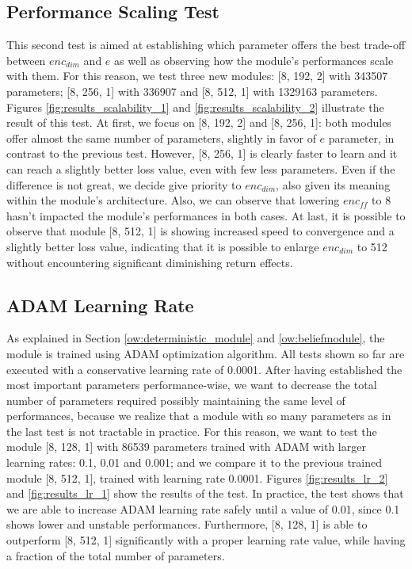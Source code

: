         \subsection{Performance Scaling Test}
            This second test is aimed at establishing which parameter offers the best trade-off between $enc_{dim}$ and $e$ as well as observing how the module's performances scale with them. For this reason, we test three new modules: [8, 192, 2] with 343507 parameters; [8, 256, 1] with 336907 and [8, 512, 1] with 1329163 parameters. Figures \ref{fig:results_scalability_1} and \ref{fig:results_scalability_2} illustrate the result of this test. \newline
            At first, we focus on [8, 192, 2] and [8, 256, 1]: both modules offer almost the same number of parameters, slightly in favor of $e$ parameter, in contrast to the previous test. However, [8, 256, 1] is clearly faster to learn and it can reach a slightly better loss value, even with few less parameters. Even if the difference is not great, we decide give priority to $enc_{dim}$, also given its meaning within the module's architecture. Also, we can observe that lowering $enc_{ff}$ to 8 hasn't impacted the module's performances in both cases. \newline
            At last, it is possible to observe that module [8, 512, 1] is showing increased speed to convergence and a slightly better loss value, indicating that it is possible to enlarge $enc_{dim}$ to 512 without encountering significant diminishing return effects.
        
        \subsection{ADAM Learning Rate}
            As explained in Section \ref{ow:deterministic_module} and \ref{ow:beliefmodule}, the module is trained using ADAM optimization algorithm. All tests shown so far are executed with a conservative learning rate of 0.0001. After having established the most important parameters performance-wise, we want to decrease the total number of parameters required possibly maintaining the same level of performances, because we realize that a module with so many parameters as in the last test is not tractable in practice. For this reason, we want to test the module [8, 128, 1] with 86539 parameters trained with ADAM with larger learning rates: 0.1, 0.01 and 0.001; and we compare it to the previous trained module [8, 512, 1], trained with learning rate 0.0001. Figures \ref{fig:results_lr_2} and \ref{fig:results_lr_1} show the results of the test. \newline
            In practice, the test shows that we are able to increase ADAM learning rate safely until a value of 0.01, since 0.1 shows lower and unstable performances. Furthermore, [8, 128, 1] is able to outperform [8, 512, 1] significantly with a proper learning rate value, while having a fraction of the total number of parameters.
            
